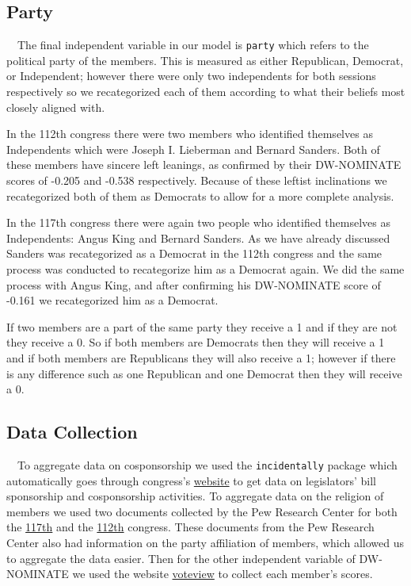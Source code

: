 \documentclass[Royal,times,sageh]{sagej}
\begin{document}
\hypertarget{party}{%
\subsection{Party}\label{party}}

\doublespacing

~~The final independent variable in our model is \texttt{party} which
refers to the political party of the members. This is measured as either
Republican, Democrat, or Independent; however there were only two
independents for both sessions respectively so we recategorized each of
them according to what their beliefs most closely aligned with.

In the 112th congress there were two members who identified themselves
as Independents which were Joseph I. Lieberman and Bernard Sanders. Both
of these members have sincere left leanings, as confirmed by their
DW-NOMINATE scores of -0.205 and -0.538 respectively. Because of these
leftist inclinations we recategorized both of them as Democrats to allow
for a more complete analysis.

In the 117th congress there were again two people who identified
themselves as Independents: Angus King and Bernard Sanders. As we have
already discussed Sanders was recategorized as a Democrat in the 112th
congress and the same process was conducted to recategorize him as a
Democrat again. We did the same process with Angus King, and after
confirming his DW-NOMINATE score of -0.161 we recategorized him as a
Democrat.

If two members are a part of the same party they receive a 1 and if they
are not they receive a 0. So if both members are Democrats then they
will receive a 1 and if both members are Republicans they will also
receive a 1; however if there is any difference such as one Republican
and one Democrat then they will receive a 0.

\hypertarget{data-collection}{%
\subsection{Data Collection}\label{data-collection}}

\doublespacing

~~To aggregate data on cosponsorship we used the \texttt{incidentally}
package which automatically goes through congress's
\href{https://www.congress.gov/}{website} to get data on legislators'
bill sponsorship and cosponsorship activities. To aggregate data on the
religion of members we used two documents collected by the Pew Research
Center for both the
\href{https://www.pewresearch.org/religion/2021/01/04/faith-on-the-hill-2021/}{117th}
and the
\href{https://www.pewresearch.org/religion/2011/01/05/faith-on-the-hill-the-religious-composition-of-the-112th-congress/\#a-look-back}{112th}
congress. These documents from the Pew Research Center also had
information on the party affiliation of members, which allowed us to
aggregate the data easier. Then for the other independent variable of
DW-NOMINATE we used the website
\href{https://voteview.com/data}{voteview} to collect each member's
scores.
\end{document}
